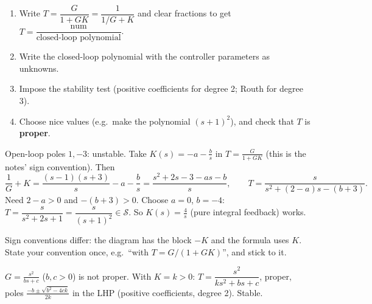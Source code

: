 \begin{methodbox}[title={Method: choose a controller to stabilise $G$}]
\begin{enumerate}
\item Write $T=\dfrac{G}{1+GK}=\dfrac{1}{1/G+K}$ and clear fractions to get $T=\dfrac{\text{num}}{\text{closed-loop polynomial}}$.
\item Write the closed-loop polynomial with the controller parameters as unknowns.
\item Impose the stability test (positive coefficients for degree 2; Routh for degree 3).
\item Choose nice values (e.g.\ make the polynomial $(s+1)^2$), and check that $T$ is \textbf{proper}.
\end{enumerate}
\end{methodbox}
\begin{workbox}[title={Worked example \fr{185}: stabilise $G(s)=\dfrac{s}{(s-1)(s+3)}$ by a PI controller}]
Open-loop poles $1,-3$: unstable. Take $K(s)=-a-\frac bs$ in $T=\frac{G}{1+GK}$ (this is the notes' sign convention). Then
\[\frac{1}{G}+K=\frac{(s-1)(s+3)}{s}-a-\frac bs=\frac{s^2+2s-3-as-b}{s},\qquad T=\frac{s}{s^2+(2-a)s-(b+3)}.\]
Need $2-a>0$ and $-(b+3)>0$. Choose $a=0$, $b=-4$: $T=\dfrac{s}{s^2+2s+1}=\dfrac{s}{(s+1)^2}\in\mathcal S$. So $K(s)=\frac4s$ (pure integral feedback) works.
\end{workbox}
\begin{warnbox}
Sign conventions differ: the diagram has the block $-K$ and the formula uses $K$. State your convention once, e.g.\ ``with $T=G/(1+GK)$'', and stick to it.
\end{warnbox}
\begin{workbox}[title={Worked example \fr{184}: proportional feedback can fix an improper plant}]
$G=\frac{s^2}{bs+c}$ ($b,c>0$) is not proper. With $K=k>0$: $T=\dfrac{s^2}{ks^2+bs+c}$, proper, poles $\frac{-b\pm\sqrt{b^2-4ck}}{2k}$ in the LHP (positive coefficients, degree 2). Stable.
\end{workbox}

